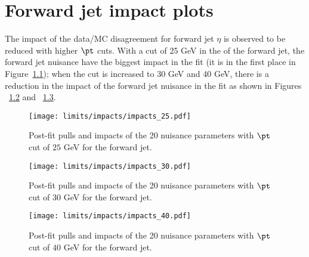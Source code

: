 \chapter{Forward jet impact plots}\label{app:forward_jet_impact}

The impact of the data/MC disagreement for forward jet $\eta$ is observed to be reduced with higher $\pt$ cuts. With a cut of 25 GeV in the \pt of the forward jet, the forward jet nuisance have the biggest impact in the fit (it is in the first place in Figure~\ref{fig:impact25}); when the \pt cut is increased to 30 GeV and 40 GeV, there is a reduction in the impact of the forward jet \etac nuisance in the fit as shown in Figures ~\ref{fig:impact30} and ~\ref{fig:impact40}. 

\begin{figure} [!h]
 \centering
 \texttt{[image: limits/impacts/impacts\_25.pdf]}\\
\caption[Post-fit pulls and impacts with $\pt$ cut $25$ GeV for the forward jet]{Post-fit pulls and impacts of the 20 nuisance parameters with $\pt$ cut of $25$ GeV for the forward jet.}
\label{fig:impact25}
\end{figure}

\begin{figure} [!h]
 \centering
 \texttt{[image: limits/impacts/impacts\_30.pdf]}\\
\caption[Post-fit pulls and impacts with $\pt$ cut $30$ GeV for the forward jet]{Post-fit pulls and impacts of the 20 nuisance parameters with $\pt$ cut of $30$ GeV for the forward jet.}
\label{fig:impact30}
\end{figure}

\begin{figure} [!h]
 \centering
 \texttt{[image: limits/impacts/impacts\_40.pdf]}\\
\caption[Post-fit pulls and impacts with $\pt$ cut $25$ GeV for the forward jet]{Post-fit pulls and impacts of the 20 nuisance parameters with $\pt$ cut of $40$ GeV for the forward jet.}
\label{fig:impact40}
\end{figure}

